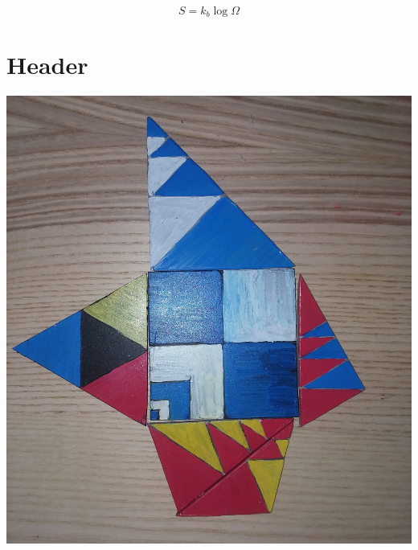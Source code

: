 \documentclass[11pt]{article}
\begin{document}
$$S = k_b\log{\Omega}$$



\section{Header}



\includegraphics[width=\linewidth]{foo_images/image0.jpg}
\end{document}
